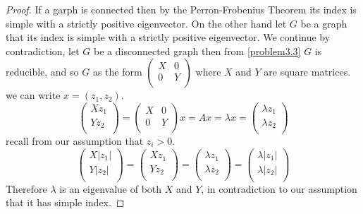 \documentclass[a4paper, 11pt, oneside]{article}
\newcommand\abs[1]{\left|#1\right|}
\begin{document}
\begin{proof}
If a garph is connected then by the Perron-Frobenius Theorem \cite{perron_frobenius} its index is simple with a strictly positive eigenvector.
On the other hand let $G$ be a graph that  its index is simple with a strictly positive eigenvector.
We continue by contradiction, let $G$ be a disconnected graph then from \ref{problem3.3} $G$ is reducible, and so $G$ as the form
$\begin{pmatrix}
X & 0 \\ 
0 & Y \\ 
\end{pmatrix}$
where $X$ and $Y$ are square matrices. we can write $x = (z_1,z_2)$.
\begin{equation*}
\begin{pmatrix}
X z_1 \\ 
Y z_2\\ 
\end{pmatrix} =
\begin{pmatrix}
X & 0 \\ 
0 & Y \\ 
\end{pmatrix} x = Ax = \lambda x =
\begin{pmatrix}
\lambda z_1 \\ 
\lambda z_2\\ 
\end{pmatrix}
\end{equation*}
recall from our assumption that $z_i > 0$.
\begin{equation*}
\begin{pmatrix}
X \abs{z_1} \\ 
Y \abs{z_2}\\ 
\end{pmatrix} =
\begin{pmatrix}
X z_1 \\ 
Y z_2\\ 
\end{pmatrix} =
\begin{pmatrix}
\lambda z_1 \\ 
\lambda z_2\\ 
\end{pmatrix} =
\begin{pmatrix}
\lambda \abs{z_1} \\ 
\lambda \abs{z_2}\\ 
\end{pmatrix}
\end{equation*}
Therefore $\lambda$ is an eigenvalue of both $X$ and $Y$, in contradiction to our assumption that it has simple index.
\end{proof}
\end{document}
